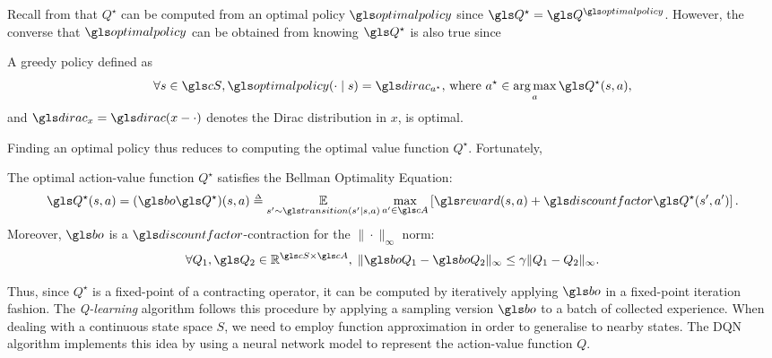 Recall from  that $Q^\star$ can be computed from an optimal policy $\optimalpolicy$ since $\Q^\star = \Q^{\optimalpolicy}$. However, the converse that $\optimalpolicy$ can be obtained from knowing $\Q^\star$ is also true since
\begin{proposition}
	\begin{leftbar}[propositionbar]
	A greedy policy defined as
	\begin{equation*}
	\forall s\in\cS, \optimalpolicy\parentheses{\cdot \mid s} = \dirac_{a^\star},\,\text{where } {a^\star}\in \argmax_a \Q^\star(s, a),
	\end{equation*}
	and $\dirac_x = \dirac(x-\cdot)$ denotes the Dirac distribution in $x$, is optimal.
	\end{leftbar}
\end{proposition}

Finding an optimal policy thus reduces to computing the optimal value function $Q^\star$. Fortunately,
\begin{theorem}
\label{thm:bellman-optimality-mdp}
\begin{leftbar}[theorembar]
The optimal action-value function $Q^\star$ satisfies the Bellman Optimality Equation:
\begin{equation*}
\Q^\star(s, a) = (\bo \Q^{\star}) (s, a) \eqdef \expectedvalueover{s'\sim \Ps(s'|s, a)} \max_{a'\in \cA} \left[\R(s, a) + \discount \Q^\star(s', a')\right].
\end{equation*}
Moreover, $\bo$ is a $\discount$-contraction for the $\|\cdot\|_\infty$ norm:
\begin{equation*}
\forall Q_1, \Q_2\in \Real^{\cS\times\cA},\; \|\bo Q_1 - \bo Q_2\|_\infty \leq \gamma \|Q_1 - Q_2\|_\infty.
\end{equation*}
\end{leftbar}
\end{theorem}

Thus, since $Q^{\star}$ is a fixed-point of a contracting operator, it can be computed by iteratively applying $\bo$ in a fixed-point iteration fashion. The \emph{Q-learning} algorithm \citep{Watkins1992} follows this procedure by applying a sampling version $\bo$ to a batch of collected experience. When dealing with a continuous state space $S$, we need to employ function approximation in order to generalise to nearby states. The  \gls{DQN} algorithm \citep{Mnih2015humanlevel} implements this idea by using a neural network model to represent the action-value function $Q$.

